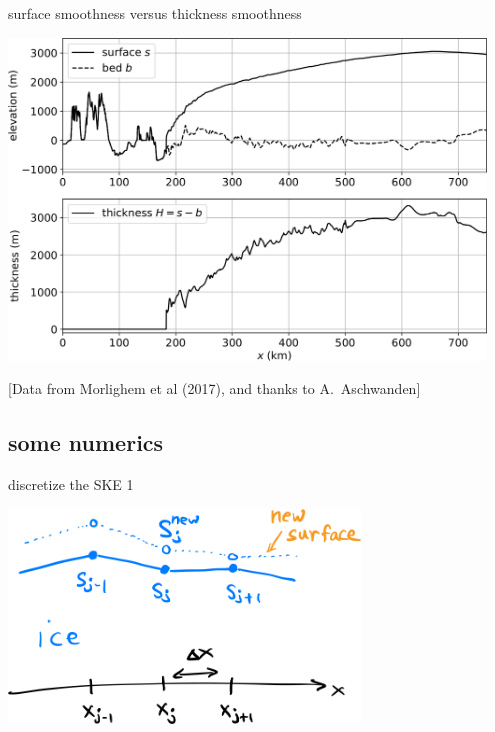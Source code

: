 \documentclass[10pt,dvipsnames]{beamer}
\begin{document}
\begin{frame}{surface smoothness versus thickness smoothness}

\bigskip
\begin{center}
\includegraphics[width=0.95\textwidth]{giscross}
\end{center}

\hfill \tiny [Data from Morlighem et al (2017), and thanks to A.~Aschwanden]
\end{frame}


\subsection{some numerics}


\begin{frame}{discretize the SKE 1}

\begin{center}
\includegraphics[width=0.7\textwidth]{surfacenotation}
\end{center}
\end{frame}
\end{document}

